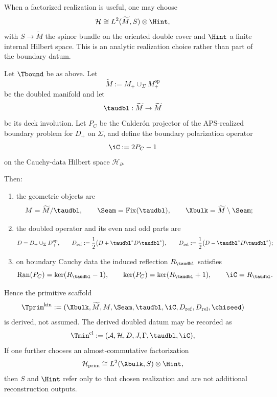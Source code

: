 \begin{remark}
\label{ass:almost-commutative-factorization}
When a factorized realization is useful, one may choose
\[
\mathcal H\cong L^2(\widetilde M,S)\otimes \Hint,
\]
with $S\to\widetilde M$ the spinor bundle on the oriented double cover and $\Hint$ a finite
internal Hilbert space. This is an analytic realization choice rather than part of the boundary
datum.
\end{remark}

\begin{theorem}
\label{thm:primitive-datum-from-reduced-datum}
\label{thm:primitive-scaffold-from-reduced-datum}
Let $\Tbound$ be as above. Let
\[
\widetilde M:=M_+\cup_{\Sigma} M_+^{\mathrm{op}}
\]
be the doubled manifold and let
\[
\taudbl:\widetilde M\to\widetilde M
\]
be its deck involution. Let $P_C$ be the Calder\'on projector of the APS-realized boundary problem
for $D_+$ on $\Sigma$, and define the boundary polarization operator
\[
\iC:=2P_C-1
\]
on the Cauchy-data Hilbert space $\mathcal H_{\partial}$.

Then:
\begin{enumerate}[label=(\roman*), leftmargin=1.8em, topsep=3pt, itemsep=2pt]
    \item the geometric objects are
    \[
    M=\widetilde M/\taudbl,
    \qquad
    \Seam=\mathrm{Fix}(\taudbl),
    \qquad
    \Xbulk=\widetilde M\setminus\Seam;
    \]
    \item the doubled operator and its even and odd parts are
    \[
    D=D_+\cup_{\Sigma}D_+^{\mathrm{op}},
    \qquad
    D_{\mathrm{ref}}:=\frac12\bigl(D+\taudbl^{\ast}D\taudbl^{\ast}\bigr),
    \qquad
    D_{\mathrm{rel}}:=\frac12\bigl(D-\taudbl^{\ast}D\taudbl^{\ast}\bigr);
    \]
    \item on boundary Cauchy data the induced reflection $R_{\taudbl}$ satisfies
    \[
    \operatorname{Ran}(P_C)=\ker(R_{\taudbl}-1),
    \qquad
    \ker(P_C)=\ker(R_{\taudbl}+1),
    \qquad
    \iC=R_{\taudbl}.
    \]
\end{enumerate}
Hence the primitive scaffold
\[
\Tprim^{\mathrm{kin}}
:=
(\Xbulk,\widetilde M,M,\Seam,\taudbl,\iC,D_{\mathrm{ref}},D_{\mathrm{rel}},\chiseed)
\]
is derived, not assumed. The derived doubled datum may be recorded as
\[
\Tmin^{\mathrm{cl}}:=(\mathcal A,\mathcal H,D,J,\Gamma,\taudbl,\iC),
\]
If one further chooses an almost-commutative factorization
\[
\mathcal H_{\mathrm{prim}}\cong L^2(\Xbulk,S)\otimes \Hint,
\]
then $S$ and $\Hint$ refer only to that chosen realization and are not additional
reconstruction outputs.
\end{theorem}

